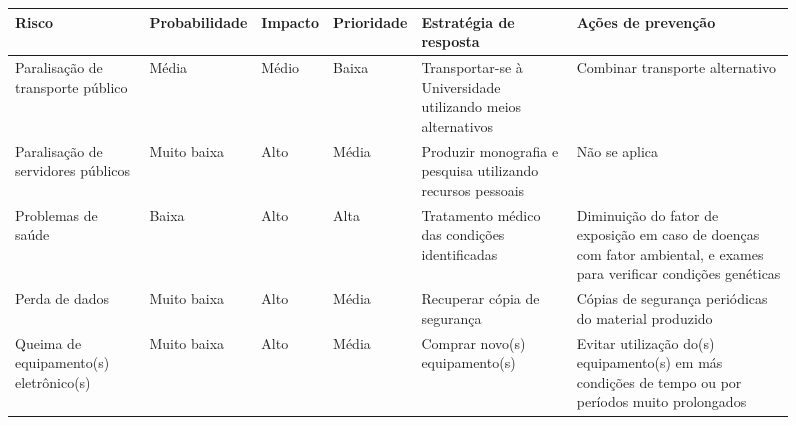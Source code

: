 \documentclass{ufsctex/ufsctex}
\begin{document}
\begin{figure}[htbp]
  \footnotesize
    \begin{tabular}{|P{1.3cm}|*{3}{P{0.8cm}|}*{2}{P{2.24cm}|}}
    \hline {}
    \textbf{Risco} & \textbf{Proba\-bilidade} & \textbf{Impacto}
      & \textbf{Priori\-dade} & \textbf{Estratégia de resposta}
      & \textbf{Ações de prevenção} \\
    \hline Paralisação de transporte público & Média & Médio & Baixa
      & Transportar-se à Universidade utilizando meios alternativos
      & Combinar transporte alternativo \\
    \hline Paralisação de servidores públicos & Muito baixa & Alto & Média
      & Produzir monografia e pesquisa utilizando recursos pessoais
      & Não se aplica \\
    \hline Problemas de saúde & Baixa & Alto & Alta
      & Tratamento médico das condições identificadas
      & Diminuição do fator de exposição em caso de doenças com fator
        ambiental, e exames para verificar condições genéticas \\
    \hline Perda de dados & Muito baixa & Alto & Média
      & Recuperar cópia de segurança
      & Cópias de segurança periódicas do material produzido \\
    \hline Queima de equipamento(s) eletrônico(s) & Muito baixa & Alto & Média
      & Comprar novo(s) equipamento(s)
      & Evitar utilização do(s) equipamento(s) em más condições de tempo ou
        por períodos muito prolongados \\
    \hline
  \end{tabular}
\end{figure}



\end{document}
